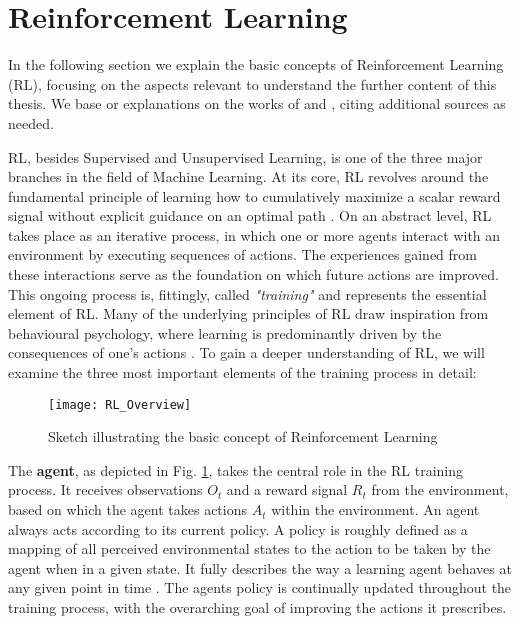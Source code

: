 \section{Reinforcement Learning} \label{sec: Reinforcement Learning}
In the following section we explain the basic concepts of Reinforcement Learning (RL), focusing on the aspects relevant to understand the further content of this thesis.
We base or explanations on the works of \cite{sutton2018reinforcement} and \cite{silver2015}, citing additional sources as needed.

RL, besides Supervised and Unsupervised Learning, is one of the three major branches in the field of Machine Learning.
At its core, RL revolves around the fundamental principle of learning how to cumulatively maximize a scalar reward signal without explicit guidance on an optimal path \parencite{sutton2018reinforcement}.
On an abstract level, RL takes place as an iterative process, in which one or more agents interact with an environment by executing sequences of actions.
The experiences gained from these interactions serve as the foundation on which future actions are improved.
This ongoing process is, fittingly, called \emph{"training"} and represents the essential element of RL.
Many of the underlying principles of RL draw inspiration from behavioural psychology, where learning is predominantly driven by the consequences of one's actions \parencite{sutton2018reinforcement, joshi2021reinforcement}.
To gain a deeper understanding of RL, we will examine the three most important elements of the training process in detail:

\begin{figure}[h]
	\centerline{\texttt{[image: RL\_Overview]}}
	\caption[RL concept illustration]{Sketch illustrating the basic concept of Reinforcement Learning}
	\label{figure: RL Illustration}
\end{figure}


The \textbf{agent}, as depicted in Fig. \ref{figure: RL Illustration}, takes the central role in the RL training process.
It receives observations $O_t$ and a reward signal $R_t$ from the environment, based on which the agent takes actions $A_t$ within the environment.
An agent always acts according to its current policy.
A policy is roughly defined as a mapping of all perceived environmental states to the action to be taken by the agent when in a given state.
It fully  describes the way a learning agent behaves at any given point in time \parencite{sutton2018reinforcement, silver2015}.
The agents policy is continually updated throughout the training process, with the overarching goal of improving the actions it prescribes.

